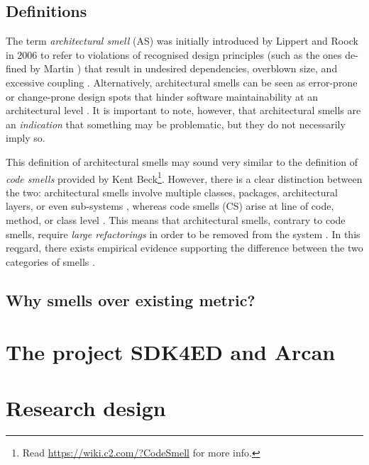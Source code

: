 \subsection{Definitions}
The term \emph{architectural smell} (AS) was initially introduced by Lippert and Roock in 2006 \cite{Lippert2006} to refer to violations of recognised design principles (such as the ones de-
fined by Martin \cite{Martin2018}) that result in undesired dependencies, overblown size, and excessive coupling \cite{Garcia2009}.
Alternatively, architectural smells can be seen as error-prone or change-prone design spots that hinder software maintainability at an architectural level \cite{Mo2015}.
It is important to note, however, that architectural smells are an \emph{indication} that something may be problematic, but they do not necessarily imply so.

This definition of architectural smells may sound very similar to the definition of \emph{code smells} provided by Kent Beck\footnote{Read \url{https://wiki.c2.com/?CodeSmell} for more info.}. However, there is a clear distinction between the two: architectural smells involve multiple classes, packages, architectural layers, or even sub-systems \cite{Lippert2006}, whereas code smells (CS) arise at line of code, method, or class level \cite{Fowler2002}. 
This means that architectural smells, contrary to code smells, require \emph{large refactorings} in order to be removed from the system \cite{Lippert2006}.
In this reqgard, there exists empirical evidence supporting the difference between the two categories of smells \cite{Arcelli2019}.

\subsection{Why smells over existing metric?}

\section{The project SDK4ED and Arcan}

\section{Research design}\label{sec:intro:research-design}
